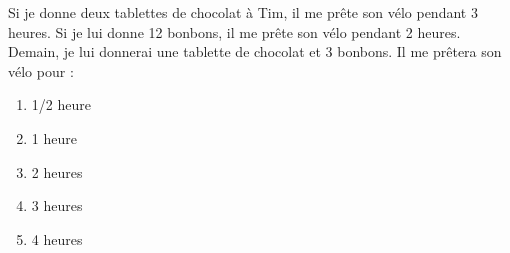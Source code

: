 Si je donne deux tablettes de chocolat à Tim, il me prête son vélo
pendant 3 heures. Si je lui donne 12 bonbons, il me prête son vélo
pendant 2 heures. Demain, je lui donnerai une tablette de chocolat et
3 bonbons. Il me prêtera son vélo pour :
\begin{multicols}{5}
  \begin{enumerate}[A/]
  \item 1/2 heure
  \item 1 heure
  \item 2 heures
  \item 3 heures
  \item 4 heures
  \end{enumerate}
\end{multicols}